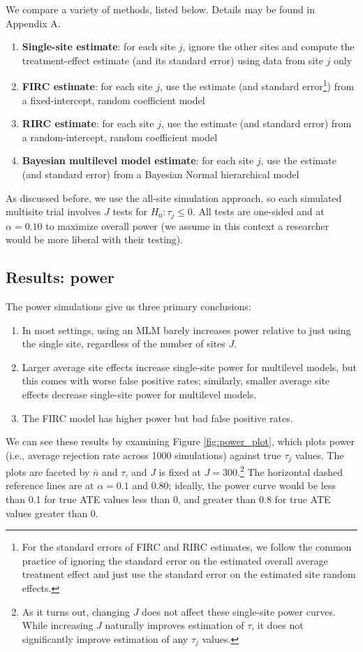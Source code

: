\documentclass[]{article}
\begin{document}
We compare a variety of methods, listed below.
Details may be found in Appendix A.
\begin{enumerate}
	\item \textbf{Single-site estimate}: for each site $j$, ignore the other sites and compute the treatment-effect estimate (and its standard error) using data from site $j$ only
	\item \textbf{FIRC estimate}: for each site $j$, use the estimate (and standard error\footnote{For the standard errors of FIRC and RIRC estimates, we follow the common practice of ignoring the standard error on the estimated overall average treatment effect and just use the standard error on the estimated site random effects.}) from a fixed-intercept, random coefficient model
	\item \textbf{RIRC estimate}: for each site $j$, use the estimate (and standard error) from a random-intercept, random coefficient model
	\item \textbf{Bayesian multilevel model estimate}: for each site $j$, use the estimate (and standard error) from a Bayesian Normal hierarchical model
\end{enumerate}

As discussed before, we use the all-site simulation approach, so each simulated multisite trial involves $J$ tests for $H_0: \tau_j \leq 0$.
All tests are one-sided and at $\alpha=0.10$ to maximize overall power (we assume in this context a researcher would be more liberal with their testing).

\subsection{Results: power}

The power simulations give us three primary conclusions:
\begin{enumerate}
	\item In most settings, using an MLM barely increases power relative to just using the single site, regardless of the number of sites $J$.
	\item Larger average site effects increase single-site power for multilevel models, but this comes with worse false positive rates; similarly, smaller average site effects decrease single-site power for multilevel models.
	\item The FIRC model has higher power but bad false positive rates.
\end{enumerate}

We can see these results by examining Figure \ref{fig:power_plot}, which plots power (i.e., average rejection rate across 1000 simulations) against true $\tau_j$ values.
The plots are faceted by $\bar{n}$ and $\tau$, and $J$ is fixed at $J=300$.\footnote{As it turns out, changing $J$ does not affect these single-site power curves.
While increasing $J$ naturally improves estimation of $\tau$, it does not significantly improve estimation of any $\tau_j$ values.}
The horizontal dashed reference lines are at $\alpha = 0.1$ and $0.80$; ideally, the power curve would be less than 0.1 for true ATE values less than 0, and greater than 0.8 for true ATE values greater than 0.
\end{document}
